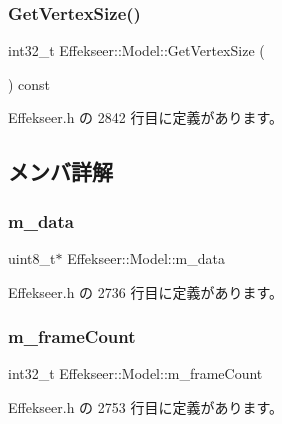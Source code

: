 \subsubsection{\texorpdfstring{Get\+Vertex\+Size()}{GetVertexSize()}}
{\footnotesize\ttfamily int32\+\_\+t Effekseer\+::\+Model\+::\+Get\+Vertex\+Size (\begin{DoxyParamCaption}{ }\end{DoxyParamCaption}) const\hspace{0.3cm}{\ttfamily [inline]}}



 Effekseer.\+h の 2842 行目に定義があります。



\subsection{メンバ詳解}
\mbox{\label{class_effekseer_1_1_model_ad5772e9423e411e5a08c51a9c30049d3}} 
\subsubsection{\texorpdfstring{m\+\_\+data}{m\_data}}
{\footnotesize\ttfamily uint8\+\_\+t$\ast$ Effekseer\+::\+Model\+::m\+\_\+data\hspace{0.3cm}{\ttfamily [private]}}



 Effekseer.\+h の 2736 行目に定義があります。

\mbox{\label{class_effekseer_1_1_model_a49e0dc4694aaae95444144089544e53a}} 
\subsubsection{\texorpdfstring{m\+\_\+frame\+Count}{m\_frameCount}}
{\footnotesize\ttfamily int32\+\_\+t Effekseer\+::\+Model\+::m\+\_\+frame\+Count\hspace{0.3cm}{\ttfamily [private]}}



 Effekseer.\+h の 2753 行目に定義があります。

